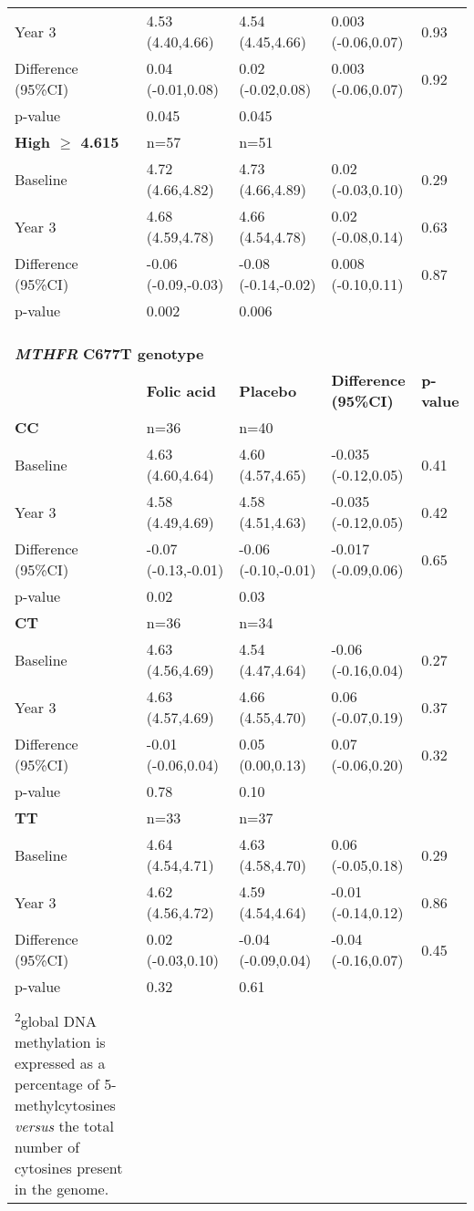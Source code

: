 \begin{longtable}{lllll}
 Year 3 & 4.53 (4.40,4.66) & 4.54 (4.45,4.66) & 0.003 (-0.06,0.07) & 0.93\\
 Difference (95\%CI) & 0.04 (-0.01,0.08) & 0.02 (-0.02,0.08) & 0.003 (-0.06,0.07) & 0.92\\
 p-value & 0.045 & 0.045 & ~ & ~ \\
\bfseries High ${\geq}$ 4.615 & n=57 & n=51 & ~ & ~ \\
 Baseline & 4.72 (4.66,4.82) & 4.73 (4.66,4.89) & 0.02 (-0.03,0.10) & 0.29\\
 Year 3 & 4.68 (4.59,4.78) & 4.66 (4.54,4.78) & 0.02 (-0.08,0.14) & 0.63\\
 Difference (95\%CI) & {}-0.06 (-0.09,-0.03) & {}-0.08 (-0.14,-0.02) & 0.008 (-0.10,0.11) & 0.87\\
 p-value & 0.002 & 0.006 & ~ & ~ \\
 \\
 \\
 \\
\multicolumn{5}{l}{\textbf{\textit{MTHFR}}\textbf{ C677T genotype}}\\
~ & \bfseries Folic acid & \bfseries Placebo & \bfseries Difference (95\%CI) & \bfseries p-value\\
\bfseries CC & n=36 & n=40 & ~ & ~ \\
 Baseline & 4.63 (4.60,4.64) & 4.60 (4.57,4.65) & {}-0.035 (-0.12,0.05) & 0.41\\
 Year 3 & 4.58 (4.49,4.69) & 4.58 (4.51,4.63) & {}-0.035 (-0.12,0.05) & 0.42\\
 Difference (95\%CI) & {}-0.07 (-0.13,-0.01) & {}-0.06 (-0.10,-0.01) & {}-0.017 (-0.09,0.06) & 0.65\\
 p-value & 0.02 & 0.03 & ~ & ~ \\
\bfseries CT & n=36 & n=34 & ~ & ~ \\
 Baseline & 4.63 (4.56,4.69) & 4.54 (4.47,4.64) & {}-0.06 (-0.16,0.04) & 0.27\\
 Year 3 & 4.63 (4.57,4.69) & 4.66 (4.55,4.70) & 0.06 (-0.07,0.19) & 0.37\\
 Difference (95\%CI) & {}-0.01 (-0.06,0.04) & 0.05 (0.00,0.13) & 0.07 (-0.06,0.20) & 0.32\\
 p-value & 0.78 & 0.10 & ~ & ~ \\
\bfseries TT & n=33 & n=37 & ~ & ~ \\
 Baseline & 4.64 (4.54,4.71) & 4.63 (4.58,4.70) & 0.06 (-0.05,0.18) & 0.29\\
 Year 3 & 4.62 (4.56,4.72) & 4.59 (4.54,4.64) & {}-0.01 (-0.14,0.12) & 0.86\\
 Difference (95\%CI) & 0.02 (-0.03,0.10) & {}-0.04 (-0.09,0.04) & {}-0.04 (-0.16,0.07) & 0.45\\
 p-value & 0.32 & 0.61 & ~ & ~ \\
\hline
\caption*{\footnotesize{\textsuperscript{1}values are given as median (inter-quartile range).\\\textsuperscript{2}global DNA methylation is expressed as a percentage of 5-methylcytosines \emph{versus} the total number of cytosines present in the genome.}}
\end{longtable}


